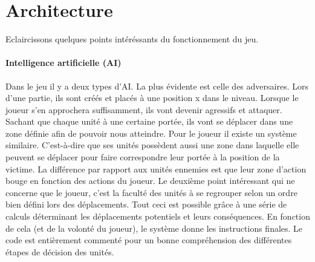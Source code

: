 \documentclass[a4paper,10pt]{article}
\begin{document}
  \pagebreak 
  \section{Architecture}
  Eclaircissons quelques points intéréssants du fonctionnement du jeu.

  \paragraph{Intelligence artificielle (AI)}
  Dans le jeu il y a deux types d'AI. La plus évidente est celle des adversaires. Lors d'une partie, ils sont créés et placés à une position x dans le niveau. Lorsque le joueur s'en approchera suffisamment, ils vont devenir agressifs et attaquer. Sachant que chaque unité à une certaine portée, ils vont se déplacer dans une zone définie afin de pouvoir nous atteindre.
  \newline Pour le joueur il existe un système similaire. C'est-à-dire que ses unités possèdent aussi une zone dans laquelle elle peuvent se déplacer pour faire correspondre leur portée à la position de la victime. La différence par rapport aux unités ennemies est que leur zone d'action bouge en fonction des actions du joueur.
  \newline Le deuxième point intéressant qui ne concerne que le joueur, c'est la faculté des unités à se regrouper selon un ordre bien défini lors des déplacements.
  \newline Tout ceci est possible grâce à une série de calculs déterminant les déplacements potentiels et leurs conséquences. En fonction de cela (et de la volonté du joueur), le système donne les instructions finales. Le code est entièrement commenté pour un bonne compréhension des différentes étapes de décision des unités.
   
\end{document}
